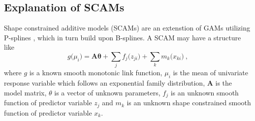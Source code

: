 \subsection{Explanation of SCAMs}

Shape constrained additive models (SCAMs) \parencite{Pya2015} are an extenstion of GAMs utilizing P-splines \parencite{Eilers1996}, which in turn build upon B-splines.  A SCAM may have a structure like
\begin{equation}
  \label{eq:SCAM}
  g\bigl(\mu_i\bigr) = \symbf{A} \symbf{\theta} + \sum_j f_j\bigl(z_{j i}\bigr) + \sum_k m_k\bigl(x_{k i}\bigr)~,
\end{equation}
where \(g\) is a known smooth monotonic link function, \(\mu_i\) is the mean of univariate response variable which follows an exponential family distribution, \(\symbf{A}\) is the model matrix, \(\theta\) is a vector of unknown parameters, \(f_j\) is an unknown smooth function of predictor variable \(z_j\) and \(m_k\) is an unknown shape constrained smooth function of predictor variable \(x_k\).

